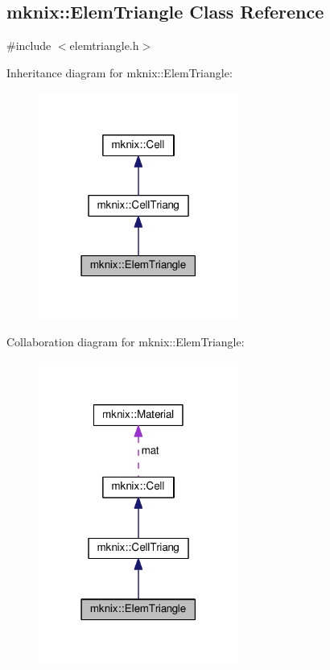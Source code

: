 \hypertarget{classmknix_1_1_elem_triangle}{}\subsection{mknix\+:\+:Elem\+Triangle Class Reference}
\label{classmknix_1_1_elem_triangle}


{\ttfamily \#include $<$elemtriangle.\+h$>$}



Inheritance diagram for mknix\+:\+:Elem\+Triangle\+:\nopagebreak
\begin{figure}[H]
\begin{center}
\leavevmode
\includegraphics[width=186pt]{d6/db0/classmknix_1_1_elem_triangle__inherit__graph}
\end{center}
\end{figure}


Collaboration diagram for mknix\+:\+:Elem\+Triangle\+:\nopagebreak
\begin{figure}[H]
\begin{center}
\leavevmode
\includegraphics[width=186pt]{dd/df8/classmknix_1_1_elem_triangle__coll__graph}
\end{center}
\end{figure}
